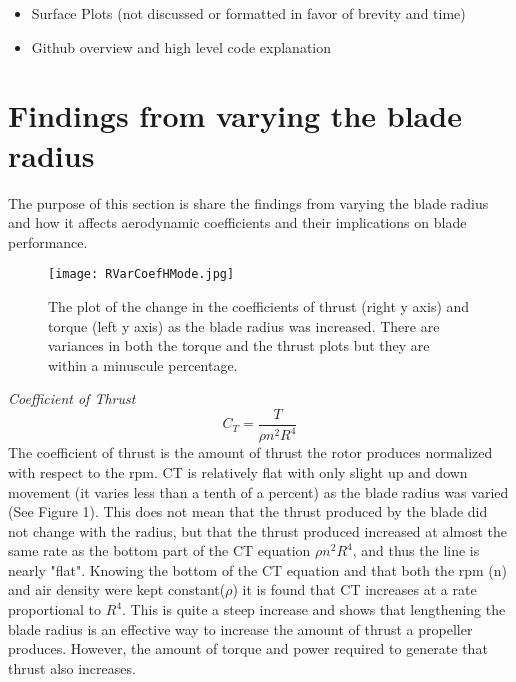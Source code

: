 \documentclass[12pt]{texmemo} %
\begin{document}
\begin{itemize}
    \item Surface Plots (not discussed or formatted in favor of brevity and time)
    \item Github overview and high level code explanation
\end{itemize}
\newpage 

\section{Findings from varying the blade radius}

The purpose of this section is share the findings from varying the blade radius and how it affects aerodynamic coefficients and their implications on blade performance. 
\vspace{5mm} %

\begin{figure}[h]
\centering
\texttt{[image: RVarCoefHMode.jpg]}
\caption{The plot of the change in the coefficients of thrust (right y axis) and torque (left y axis) as the blade radius was increased. There are variances in both the torque and the thrust plots but they are within a minuscule percentage.}
\end{figure}

\textit{Coefficient of Thrust}
$$ C_T = \frac {T}{\rho n^2 R^4} $$
The coefficient of thrust is the amount of thrust the rotor produces normalized with respect to the rpm. CT is relatively flat with only slight up and down movement (it varies less than a tenth of a percent) as the blade radius was varied (See Figure 1). This does not mean that the thrust produced by the blade did not change with the radius, but that the thrust produced increased at almost the same rate as the bottom part of the CT equation $\rho n^2 R^4$, and thus the line is nearly "flat". Knowing the bottom of the CT equation and that both the rpm (n) and air density were kept constant($\rho$) it is found that CT increases at a rate proportional to $R^4$. This is quite a steep increase and shows that lengthening the blade radius is an effective way to increase the amount of thrust a propeller produces. However, the amount of torque and power required to generate that thrust also increases.
\vspace{5mm} %
\end{document}
